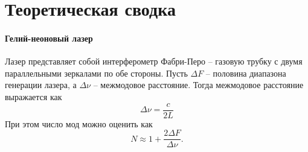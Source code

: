 \documentclass[a4paper,12pt]{article}
\begin{document}
\section*{Теоретическая сводка}
\paragraph*{Гелий-неоновый лазер}
Лазер представляет собой интерферометр Фабри-Перо -- газовую трубку с двумя параллельными зеркалами по обе стороны. Пусть $\Delta F$ -- половина диапазона генерации лазера, а $\Delta \nu$ -- межмодовое расстояние. Тогда межмодовое расстояние выражается как
\begin{equation}
    \Delta \nu = \dfrac{c}{2L}
\end{equation}
При этом число мод можно оценить как 
\begin{equation}
N \approx 1 + \dfrac{2\Delta F}{\Delta \nu}.
\end{equation}
\end{document}
